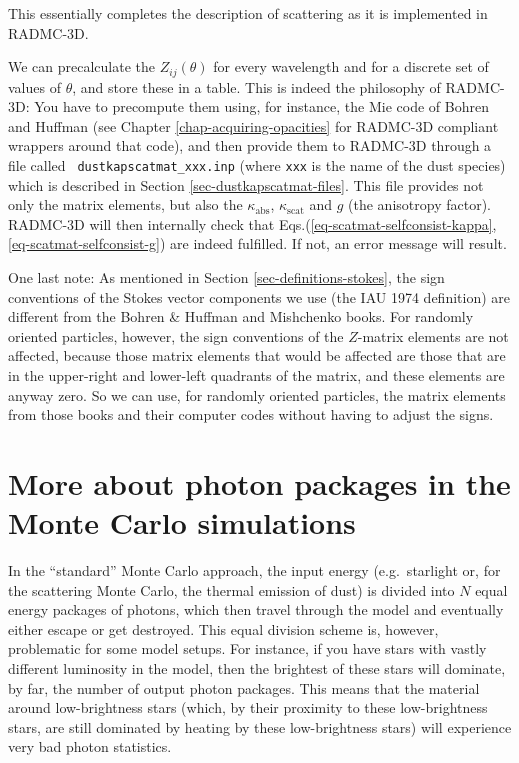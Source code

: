 \documentclass{report}
\begin{document}
This essentially completes the description of scattering as it is
implemented in RADMC-3D.

We can precalculate the $Z_{ij}(\theta)$ for every wavelength and for a
discrete set of values of $\theta$, and store these in a table. This is
indeed the philosophy of RADMC-3D: You have to precompute them using, for
instance, the Mie code of Bohren and Huffman (see Chapter
\ref{chap-acquiring-opacities} for RADMC-3D compliant wrappers around that
code), and then provide them to RADMC-3D through a file called {\small\tt
  dustkapscatmat\_xxx.inp} (where {\small\tt xxx} is the name of the dust
species) which is described in Section \ref{sec-dustkapscatmat-files}.  This
file provides not only the matrix elements, but also the
$\kappa_{\mathrm{abs}}$, $\kappa_{\mathrm{scat}}$ and $g$ (the anisotropy
factor). RADMC-3D will then internally check that
Eqs.(\ref{eq-scatmat-selfconsist-kappa}, \ref{eq-scatmat-selfconsist-g}) are
indeed fulfilled. If not, an error message will result.

One last note: As mentioned in Section \ref{sec-definitions-stokes}, the
sign conventions of the Stokes vector components we use (the IAU 1974
definition) are different from the Bohren \& Huffman and Mishchenko
books. For randomly oriented particles, however, the sign conventions of the
$Z$-matrix elements are not affected, because those matrix elements that
would be affected are those that are in the upper-right and lower-left
quadrants of the matrix, and these elements are anyway zero. So we can use,
for randomly oriented particles, the matrix elements from those books and
their computer codes without having to adjust the signs.

\section{More about photon packages in the Monte Carlo simulations}
\label{sec-photon-packages-mc}
%
In the ``standard'' Monte Carlo approach, the input energy (e.g.\ starlight
or, for the scattering Monte Carlo, the thermal emission of dust) is divided
into $N$ equal energy packages of photons, which then travel through the
model and eventually either escape or get destroyed. This equal division
scheme is, however, problematic for some model setups. For instance, if you
have stars with vastly different luminosity in the model, then the brightest
of these stars will dominate, by far, the number of output photon packages.
This means that the material around low-brightness stars (which, by their
proximity to these low-brightness stars, are still dominated by heating by
these low-brightness stars) will experience very bad photon statistics.
\end{document}
